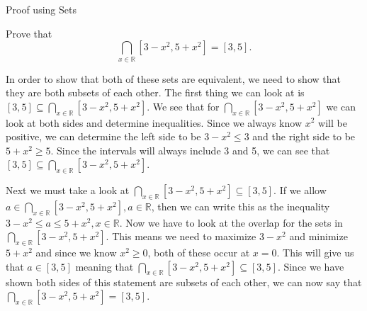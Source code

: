 Proof using Sets

Prove that 
\[\bigcap_{x\in\mathbb{R}} [3-x^2,5+x^2]=[3,5].\]

\begin{solution}
In order to show that both of these sets are equivalent, we need to show that they are both subsets of each other. The first thing we can look at is $[3,5]\subseteq\bigcap_{x\in\mathbb{R}} [3-x^2,5+x^2]$. We see that for $\bigcap_{x\in\mathbb{R}} [3-x^2,5+x^2]$ we can look at both sides and determine inequalities. Since we always know $x^2$ will be positive, we can determine the left side to be $ 3 - x^2 \leq 3$ and the right side to be $5 + x^2 \geq 5$. Since the intervals will always include 3 and 5, we can see that $[3,5]\subseteq\bigcap_{x\in\mathbb{R}} [3-x^2,5+x^2]$. 

Next we must take a look at $\bigcap_{x\in\mathbb{R}} [3-x^2,5+x^2]\subseteq[3,5].$ If we allow $ a \in \bigcap_{x\in\mathbb{R}} [3-x^2,5+x^2], a \in \mathbb{R}$, then we can write this as the inequality $3 - x^2 \leq a \leq 5 + x^2, x \in \mathbb{R}$. Now we have to look at the overlap for the sets in $\bigcap_{x\in\mathbb{R}} [3-x^2,5+x^2]$. This means we need to maximize $3 - x^2$ and minimize $5 + x^2$ and since we know $x^2 \geq 0$, both of these occur at $x=0$. This will give us that $a \in [3,5]$ meaning that $\bigcap_{x\in\mathbb{R}} [3-x^2,5+x^2]\subseteq[3,5]$. Since we have shown both sides of this statement are subsets of each other, we can now say that $\bigcap_{x\in\mathbb{R}} [3-x^2,5+x^2]=[3,5].$
\end{solution}